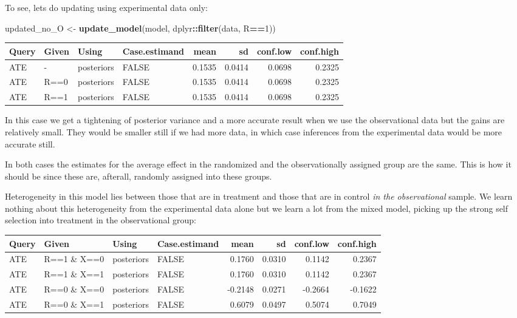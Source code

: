 \documentclass[
  12pt,
]{book}
\newenvironment{Shaded}{\begin{snugshade}}{\end{snugshade}}
\newcommand{\DecValTok}[1]{\textcolor[rgb]{0.00,0.00,0.81}{#1}}
\newcommand{\FunctionTok}[1]{\textcolor[rgb]{0.13,0.29,0.53}{\textbf{#1}}}
\newcommand{\NormalTok}[1]{#1}
\newcommand{\OtherTok}[1]{\textcolor[rgb]{0.56,0.35,0.01}{#1}}
\newcommand{\SpecialCharTok}[1]{\textcolor[rgb]{0.81,0.36,0.00}{\textbf{#1}}}
\begin{document}
To see, lets do updating using experimental data only:

\begin{Shaded}
\begin{Highlighting}[]
\NormalTok{updated\_no\_O }\OtherTok{\textless{}{-}} \FunctionTok{update\_model}\NormalTok{(model, dplyr}\SpecialCharTok{::}\FunctionTok{filter}\NormalTok{(data, R}\SpecialCharTok{==}\DecValTok{1}\NormalTok{))}
\end{Highlighting}
\end{Shaded}

\begin{tabular}{l|l|l|l|r|r|r|r}
\hline
Query & Given & Using & Case.estimand & mean & sd & conf.low & conf.high\\
\hline
ATE & - & posteriors & FALSE & 0.1535 & 0.0414 & 0.0698 & 0.2325\\
\hline
ATE & R==0 & posteriors & FALSE & 0.1535 & 0.0414 & 0.0698 & 0.2325\\
\hline
ATE & R==1 & posteriors & FALSE & 0.1535 & 0.0414 & 0.0698 & 0.2325\\
\hline
\end{tabular}

In this case we get a tightening of posterior variance and a more accurate result when we use the observational data but the gains are relatively small. They would be smaller still if we had more data, in which case inferences from the experimental data would be more accurate still.

In both cases the estimates for the average effect in the randomized and the observationally assigned group are the same. This is how it should be since these are, afterall, randomly assigned into these groups.

Heterogeneity in this model lies between those that are in treatment and those that are in control \emph{in the observational} sample. We learn nothing about this heterogeneity from the experimental data alone but we learn a lot from the mixed model, picking up the strong self selection into treatment in the observational group:

\begin{tabular}{l|l|l|l|r|r|r|r}
\hline
Query & Given & Using & Case.estimand & mean & sd & conf.low & conf.high\\
\hline
ATE & R==1 \& X==0 & posteriors & FALSE & 0.1760 & 0.0310 & 0.1142 & 0.2367\\
\hline
ATE & R==1 \& X==1 & posteriors & FALSE & 0.1760 & 0.0310 & 0.1142 & 0.2367\\
\hline
ATE & R==0 \& X==0 & posteriors & FALSE & -0.2148 & 0.0271 & -0.2664 & -0.1622\\
\hline
ATE & R==0 \& X==1 & posteriors & FALSE & 0.6079 & 0.0497 & 0.5074 & 0.7049\\
\hline
\end{tabular}
\end{document}
